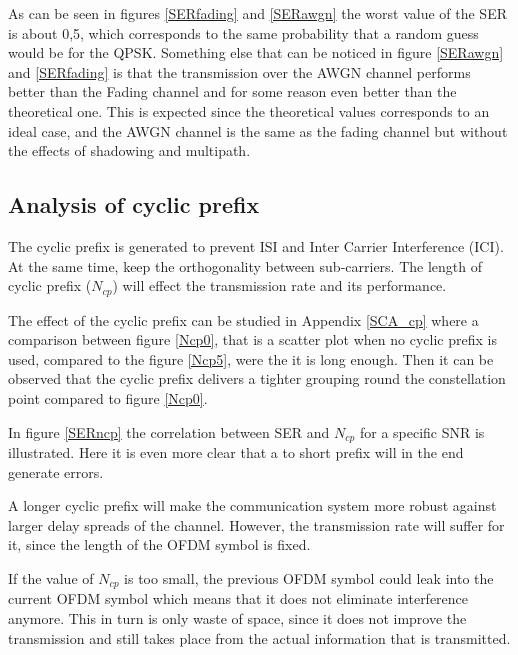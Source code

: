 \documentclass[conference]{IEEEtran}
\begin{document}
As can be seen in figures \ref{SERfading} and \ref{SERawgn} the worst value of the SER is about 0,5, which corresponds to the same probability that a random guess would be for the QPSK. Something else that can be noticed in figure \ref{SERawgn} and \ref{SERfading} is that the transmission over the AWGN channel performs better than the Fading channel and for some reason even better than the theoretical one. This is expected since the theoretical values corresponds to an ideal case, and the AWGN channel is the same as the fading channel but without the effects of shadowing and multipath.


\subsection{Analysis of cyclic prefix}
The cyclic prefix is generated to prevent ISI and Inter Carrier Interference (ICI). At the same time, keep the orthogonality between sub-carriers. The length of cyclic prefix ($N_{cp}$) will effect the transmission rate and its performance. 

The effect of the cyclic prefix can be studied in Appendix \ref{SCA_cp} where a comparison between figure \ref{Ncp0}, that is a scatter plot when no cyclic prefix is used, compared to the figure \ref{Ncp5}, were the it is long enough. Then it can be observed that the cyclic prefix delivers a tighter grouping round the constellation point compared to figure \ref{Ncp0}.

In figure \ref{SERncp} the correlation between SER and $N_{cp}$ for a specific SNR is illustrated. Here it is even more clear that a to short prefix will in the end generate errors. 

A longer cyclic prefix will make the communication system more robust against larger delay spreads of the channel. However, the transmission rate will suffer for it, since the length of the OFDM symbol is fixed.

If the value of $N_{cp}$ is too small, the previous OFDM symbol could leak into the current OFDM symbol which means that it does not eliminate interference anymore. This in turn is only waste of space, since it does not improve the transmission and still takes place from the actual information that is transmitted.  
\end{document}
